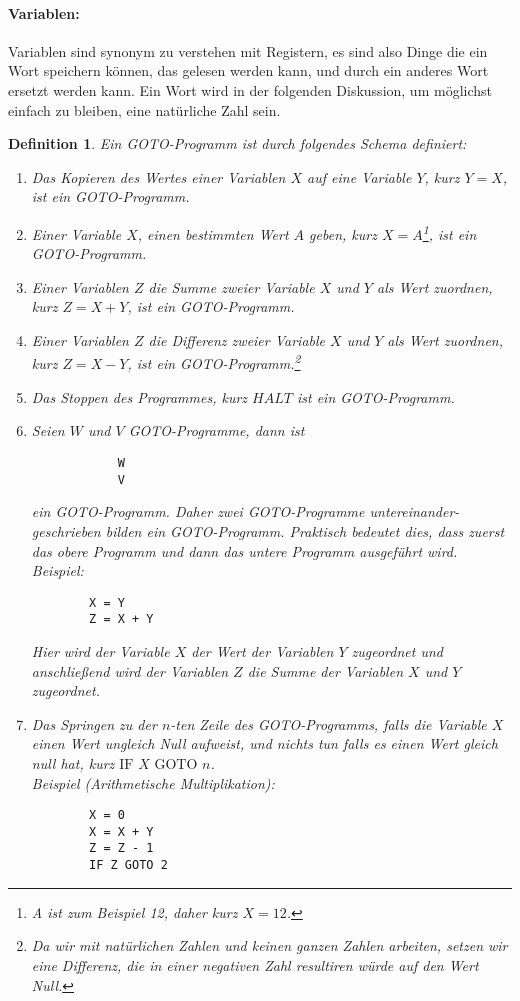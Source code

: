\documentclass[11pt,a4paper,leqno]{report}
\newtheorem{definition}[theorem]{Definition}
\numberwithin{equation}{chapter}
\begin{document}
\paragraph{Variablen:} Variablen sind synonym zu verstehen mit Registern, es sind also Dinge die ein Wort speichern können, das gelesen werden kann, und durch ein anderes Wort ersetzt werden kann. Ein Wort wird in der folgenden Diskussion, um möglichst einfach zu bleiben, eine natürliche Zahl sein. \\
\begin{definition}
	Ein GOTO-Programm ist durch folgendes Schema definiert:
	\begin{enumerate}
		\item Das Kopieren des Wertes einer Variablen $X$ auf eine Variable $Y$, kurz $Y = X$, ist ein GOTO-Programm.
		\item Einer Variable $X$, einen bestimmten Wert $A$ geben, kurz $X = A$\footnote{A ist zum Beispiel 12, daher kurz $X = 12$.}, ist ein GOTO-Programm.
		\item Einer Variablen $Z$ die Summe zweier Variable $X$ und $Y$ als Wert zuordnen, kurz $Z = X + Y$, ist ein GOTO-Programm.
		\item Einer Variablen $Z$ die Differenz zweier Variable $X$ und $Y$ als Wert zuordnen, kurz $Z = X - Y$, ist ein GOTO-Programm.\footnote{Da wir mit natürlichen Zahlen und keinen ganzen Zahlen arbeiten, setzen wir eine Differenz, die in einer negativen Zahl resultiren würde auf den Wert Null.}
		\item Das Stoppen des Programmes, kurz $HALT$ ist ein GOTO-Programm.
		\newpage
		\item Seien $W$ und $V$ GOTO-Programme, dann ist
		\begin{lstlisting}
			W
			V
		\end{lstlisting}
		ein GOTO-Programm. Daher zwei GOTO-Programme untereinander- geschrieben bilden ein GOTO-Programm. Praktisch bedeutet dies, dass zuerst das obere Programm und dann das untere Programm ausgeführt wird. Beispiel:
		\begin{lstlisting}
		X = Y
		Z = X + Y
		\end{lstlisting}
		Hier wird der Variable $X$ der Wert der Variablen $Y$ zugeordnet und anschließend wird der Variablen $Z$ die Summe der Variablen $X$ und $Y$ zugeordnet.
		\item Das Springen zu der $n$-ten Zeile des GOTO-Programms, falls die Variable $X$ einen Wert ungleich Null aufweist, und nichts tun falls es einen Wert gleich null hat, kurz $\text{IF }X\text{ GOTO }n$.\\
		Beispiel (Arithmetische Multiplikation): 
		\begin{lstlisting}
		X = 0
		X = X + Y
		Z = Z - 1
		IF Z GOTO 2
		\end{lstlisting}
	\end{enumerate}
\end{definition}	
\end{document}
